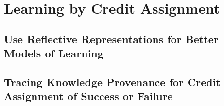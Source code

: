 \section{}


\section{Learning by Credit Assignment}

\subsection{Use Reflective Representations for Better Models of Learning}

\subsection{Tracing Knowledge Provenance for Credit Assignment of Success or Failure}



